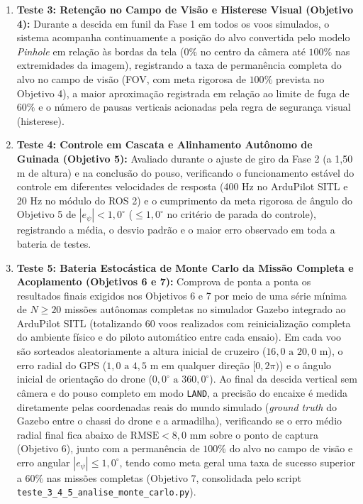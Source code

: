 \begin{enumerate}
	\item \textbf{Teste 3: Retenção no Campo de Visão e Histerese Visual (Objetivo 4):} Durante a descida em funil da Fase 1 em todos os voos simulados, o sistema acompanha continuamente a posição do alvo convertida pelo modelo \textit{Pinhole} em relação às bordas da tela ($0\%$ no centro da câmera até $100\%$ nas extremidades da imagem), registrando a taxa de permanência completa do alvo no campo de visão (FOV, com meta rigorosa de $100\%$ prevista no Objetivo 4), a maior aproximação registrada em relação ao limite de fuga de $60\%$ e o número de pausas verticais acionadas pela regra de segurança visual (histerese).
	
	\item \textbf{Teste 4: Controle em Cascata e Alinhamento Autônomo de Guinada (Objetivo 5):} Avaliado durante o ajuste de giro da Fase 2 (a 1,50 m de altura) e na conclusão do pouso, verificando o funcionamento estável do controle em diferentes velocidades de resposta (400 Hz no ArduPilot SITL e 20 Hz no módulo do ROS 2) e o cumprimento da meta rigorosa de ângulo do Objetivo 5 de $|e_\psi| < 1,0^\circ$ ($\le 1,0^\circ$ no critério de parada do controle), registrando a média, o desvio padrão e o maior erro observado em toda a bateria de testes.
	
	\item \textbf{Teste 5: Bateria Estocástica de Monte Carlo da Missão Completa e Acoplamento (Objetivos 6 e 7):} Comprova de ponta a ponta os resultados finais exigidos nos Objetivos 6 e 7 por meio de uma série mínima de $N \ge 20$ missões autônomas completas no simulador Gazebo integrado ao ArduPilot SITL (totalizando 60 voos realizados com reinicialização completa do ambiente físico e do piloto automático entre cada ensaio). Em cada voo são sorteados aleatoriamente a altura inicial de cruzeiro ($16,0\text{ a } 20,0\text{ m}$), o erro radial do GPS ($1,0\text{ a } 4,5\text{ m}$ em qualquer direção $[0, 2\pi)$) e o ângulo inicial de orientação do drone ($0,0^\circ\text{ a } 360,0^\circ$). Ao final da descida vertical sem câmera e do pouso completo em modo \texttt{LAND}, a precisão do encaixe é medida diretamente pelas coordenadas reais do mundo simulado (\textit{ground truth} do Gazebo entre o chassi do drone e a armadilha), verificando se o erro médio radial final fica abaixo de $\text{RMSE} < 8,0\text{ mm}$ sobre o ponto de captura (Objetivo 6), junto com a permanência de $100\%$ do alvo no campo de visão e erro angular $|e_\psi| \le 1,0^\circ$, tendo como meta geral uma taxa de sucesso superior a $60\%$ nas missões completas (Objetivo 7, consolidada pelo script \texttt{teste\_3\_4\_5\_\allowbreak analise\_\allowbreak monte\_\allowbreak carlo.py}).
\end{enumerate}

